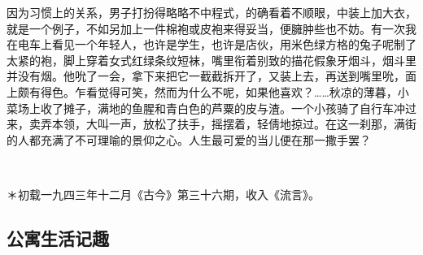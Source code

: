 \par 因为习惯上的关系，男子打扮得略略不中程式，的确看着不顺眼，中装上加大衣，就是一个例子，不如另加上一件棉袍或皮袍来得妥当，便臃肿些也不妨。有一次我在电车上看见一个年轻人，也许是学生，也许是店伙，用米色绿方格的兔子呢制了太紧的袍，脚上穿着女式红绿条纹短袜，嘴里衔着别致的描花假象牙烟斗，烟斗里并没有烟。他吮了一会，拿下来把它一截截拆开了，又装上去，再送到嘴里吮，面上颇有得色。乍看觉得可笑，然而为什么不呢，如果他喜欢？……秋凉的薄暮，小菜场上收了摊子，满地的鱼腥和青白色的芦粟的皮与渣。一个小孩骑了自行车冲过来，卖弄本领，大叫一声，放松了扶手，摇摆着，轻倩地掠过。在这一刹那，满街的人都充满了不可理喻的景仰之心。人生最可爱的当儿便在那一撒手罢？
\par  
\par ＊初载一九四三年十二月《古今》第三十六期，收入《流言》。

\subsection{公寓生活记趣}


